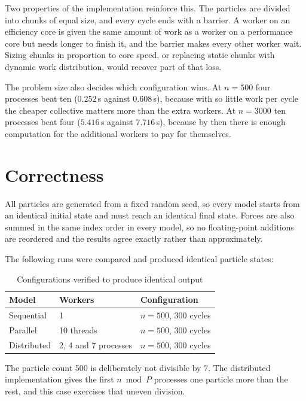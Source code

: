 \documentclass[sigconf]{acmart}
\begin{document}
Two properties of the implementation reinforce this. The particles are divided into chunks of equal
size, and every cycle ends with a barrier. A worker on an efficiency core is given the same amount of
work as a worker on a performance core but needs longer to finish it, and the barrier makes every
other worker wait. Sizing chunks in proportion to core speed, or replacing static chunks with dynamic
work distribution, would recover part of that loss.

The problem size also decides which configuration wins. At $n = 500$ four processes beat ten
($0.252$\,s against $0.608$\,s), because with so little work per cycle the cheaper collective matters
more than the extra workers. At $n = 3000$ ten processes beat four ($5.416$\,s against $7.716$\,s),
because by then there is enough computation for the additional workers to pay for themselves.

\section{Correctness}

All particles are generated from a fixed random seed, so every model starts from an identical initial
state and must reach an identical final state. Forces are also summed in the same index order in
every model, so no floating-point additions are reordered and the results agree exactly rather than
approximately.

The following runs were compared and produced identical particle states:

\begin{table}[h]
\centering
\caption{Configurations verified to produce identical output}
\begin{tabular}{@{}llp{2.2cm}@{}}
\toprule
Model & Workers & Configuration \\
\midrule
Sequential  & 1                    & $n = 500$, 300 cycles \\
Parallel    & 10 threads           & $n = 500$, 300 cycles \\
Distributed & 2, 4 and 7 processes & $n = 500$, 300 cycles \\
\bottomrule
\end{tabular}
\end{table}

The particle count 500 is deliberately not divisible by 7. The distributed implementation gives the
first $n \bmod P$ processes one particle more than the rest, and this case exercises that uneven
division.
\end{document}
